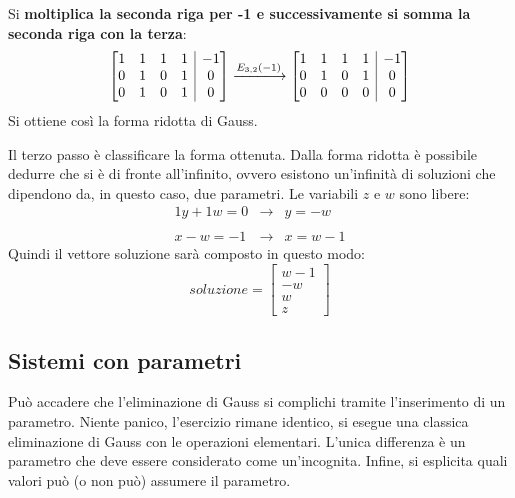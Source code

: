 \documentclass[a4paper]{article}
\makeatletter
\newenvironment{rowequmatbra}[1]{\left[\array{@{}#1@{}}}{\endarray\right]}
\makeatother
\begin{document}
	Si \textbf{moltiplica la seconda riga per -1 e successivamente si somma la seconda riga con la terza}:
	\begin{equation*}
		\begin{rowequmatbra}{cccc|c}
			1  &  1 &  1 &  1 & -1 	\\
			0  &  1 &  0 &  1 &  0	\\
			0  &  1 &  0 &  1 &  0
		\end{rowequmatbra} \xlongrightarrow{E_{3,2}\left(-1\right)}
		\begin{rowequmatbra}{cccc|c}
			1  &  1 &  1 &  1 & -1 	\\
			0  &  1 &  0 &  1 &  0	\\
			0  &  0 &  0 &  0 &  0
		\end{rowequmatbra}
	\end{equation*}
	Si ottiene così la forma ridotta di Gauss.\newline
	
	\noindent
	Il \textcolor{Red3}{terzo passo} è classificare la forma ottenuta. Dalla forma ridotta è possibile dedurre che si è di fronte all'infinito, ovvero esistono un'infinità di soluzioni che dipendono da, in questo caso, due parametri. Le variabili $z$ e $w$ sono libere:
	\begin{equation*}
		\begin{array}{rll}
			1y + 1w = 0 & \longrightarrow & y = -w \\
			\\
			x - w = -1 & \longrightarrow & x = w - 1
		\end{array}
	\end{equation*}
	Quindi il vettore soluzione sarà composto in questo modo:
	\begin{equation*}
		soluzione = \begin{bmatrix}
			w-1 \\
			-w 	\\
			w	\\
			z
		\end{bmatrix}
	\end{equation*}\newpage

	\subsection{Sistemi con parametri}\label{Sistemi con parametri}
	
	Può accadere che l'eliminazione di Gauss si complichi tramite l'inserimento di un parametro. Niente panico, l'esercizio rimane identico, si esegue una classica eliminazione di Gauss con le operazioni elementari. L'unica differenza è un parametro che deve essere considerato come un'incognita. Infine, si esplicita quali valori può (o non può) assumere il parametro.
	
\end{document}
